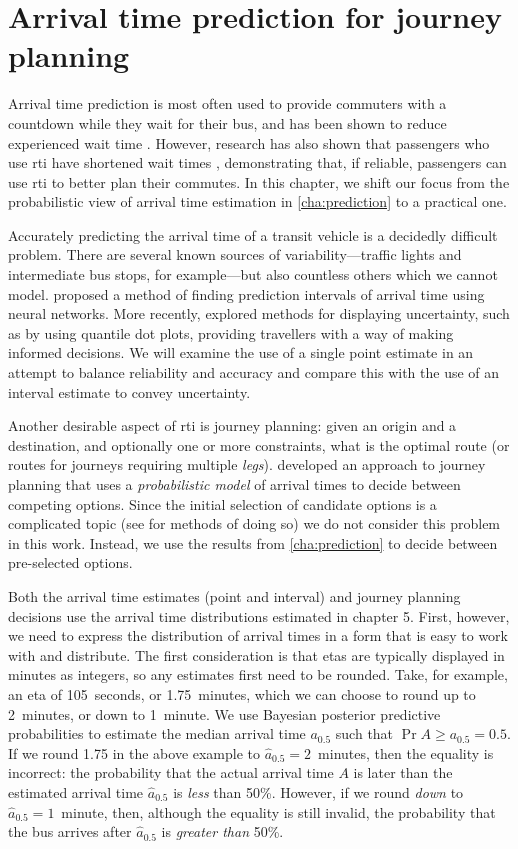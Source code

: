 
\chapter{Arrival time prediction for journey planning}
\label{cha:etas}
Arrival time prediction is most often used to provide commuters with a countdown while they wait for their bus, and has been shown to reduce experienced wait time \citep{TCRP_2003}. However, research has also shown that passengers who use \gls{rti} have shortened wait times \citep{Lu_2017}, demonstrating that, if reliable, passengers can use \gls{rti} to better plan their commutes. In this chapter, we shift our focus from the probabilistic view of arrival time estimation in \cref{cha:prediction} to a practical one.


Accurately predicting the arrival time of a transit vehicle is a decidedly difficult problem. There are several known sources of variability---traffic lights and intermediate bus stops, for example---but also countless others which we cannot model. \citet{Mazloumi_2011} proposed a method of finding prediction intervals of arrival time using neural networks. More recently, \citet{Fernandes_2018} explored methods for displaying uncertainty, such as by using quantile dot plots, providing travellers with a way of making informed decisions. We will examine the use of a single point estimate in an attempt to balance reliability and accuracy and compare this with the use of an interval estimate to convey uncertainty.


Another desirable aspect of \gls{rti} is journey planning: given an origin and a destination, and optionally one or more constraints, what is the optimal route (or routes for journeys requiring multiple \emph{legs}).  developed an approach to journey planning that uses a \emph{probabilistic model} of arrival times to decide between competing options. Since the initial selection of candidate options is a complicated topic (see \citet{Hame_2013a,Hame_2013b,Zheng_2016} for methods of doing so) we do not consider this problem in this work. Instead, we use the results from \cref{cha:prediction} to decide between pre-selected options.


Both the arrival time estimates (point and interval) and journey planning decisions use the arrival time distributions estimated in chapter 5. First, however, we need to express the distribution of arrival times in a form that is easy to work with and distribute. The first consideration is that \glspl{eta} are typically displayed in minutes as integers, so any estimates first need to be rounded. Take, for example, an \gls{eta} of 105~seconds, or 1.75~minutes, which we can choose to round up to 2~minutes, or down to 1~minute. We use Bayesian posterior predictive probabilities to estimate the median arrival time $a_{0.5}$ such that $\Pr{A \geq a_{0.5}} = 0.5$. If we round 1.75 in the above example to $\hat a_{0.5} = 2$~minutes, then the equality is incorrect: the probability that the actual arrival time $A$ is later than the estimated arrival time $\hat a_{0.5}$ is \emph{less} than 50\%. However, if we round \emph{down} to $\hat a_{0.5} = 1$~minute, then, although the equality is still invalid, the probability that the bus arrives after $\hat a_{0.5}$ is \emph{greater than} 50\%.


